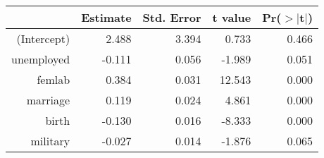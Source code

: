 \begin{table}[ht]
\centering
\begin{tabular}{rrrrr}
  \hline
 & Estimate & Std. Error & t value & Pr($>$$|$t$|$) \\ 
  \hline
(Intercept) & 2.488 & 3.394 & 0.733 & 0.466 \\ 
  unemployed & -0.111 & 0.056 & -1.989 & 0.051 \\ 
  femlab & 0.384 & 0.031 & 12.543 & 0.000 \\ 
  marriage & 0.119 & 0.024 & 4.861 & 0.000 \\ 
  birth & -0.130 & 0.016 & -8.333 & 0.000 \\ 
  military & -0.027 & 0.014 & -1.876 & 0.065 \\ 
   \hline
\end{tabular}
\end{table}
